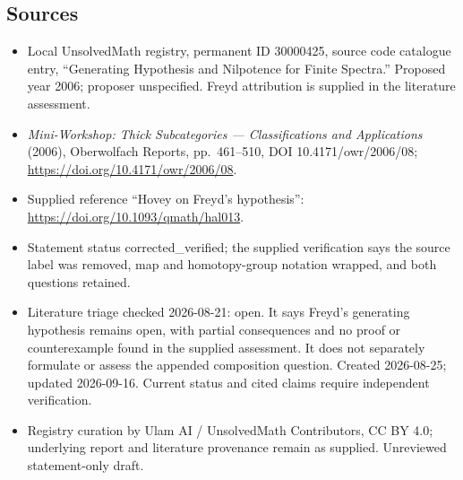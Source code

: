 \documentclass[11pt]{article}
\begin{document}
\subsection{Sources}
\begin{itemize}
\item Local UnsolvedMath registry, permanent ID 30000425, source code catalogue entry, ``Generating Hypothesis and Nilpotence for Finite Spectra.'' Proposed year 2006; proposer unspecified. Freyd attribution is supplied in the literature assessment.
\item \emph{Mini-Workshop: Thick Subcategories --- Classifications and Applications} (2006), Oberwolfach Reports, pp.\ 461--510, DOI 10.4171/owr/2006/08; \url{https://doi.org/10.4171/owr/2006/08}.
\item Supplied reference ``Hovey on Freyd's hypothesis'': \url{https://doi.org/10.1093/qmath/hal013}.
\item Statement status corrected\_verified; the supplied verification says the source label was removed, map and homotopy-group notation wrapped, and both questions retained.
\item Literature triage checked 2026-08-21: open. It says Freyd's generating hypothesis remains open, with partial consequences and no proof or counterexample found in the supplied assessment. It does not separately formulate or assess the appended composition question. Created 2026-08-25; updated 2026-09-16. Current status and cited claims require independent verification.
\item Registry curation by Ulam AI / UnsolvedMath Contributors, CC BY 4.0; underlying report and literature provenance remain as supplied. Unreviewed statement-only draft.
\end{itemize}
\end{document}
